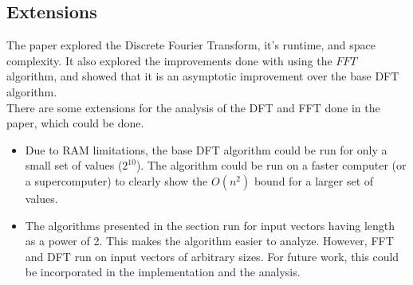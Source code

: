 \documentclass{article}
\begin{document}
\subsection{Extensions}
The paper explored the Discrete Fourier Transform, it's runtime, and space complexity. It also explored the improvements done with using the $FFT$ algorithm, and showed that it is an asymptotic improvement over the base DFT algorithm. \\
There are some extensions for the analysis of the DFT and FFT done in the paper, which could be done.
\begin{itemize}
\item
Due to RAM limitations, the base DFT algorithm could be run for only a small set of values ($2^{10}$). The algorithm could be run on a faster computer (or a supercomputer) to clearly show the $O(n^{2})$ bound for a larger set of values.
\item
The algorithms presented in the section run for input vectors having length as a power of 2. This makes the algorithm easier to analyze. However, FFT and DFT run on input vectors of arbitrary sizes. For future work, this could be incorporated in the implementation and the analysis.
\end{itemize}



\end{document}
